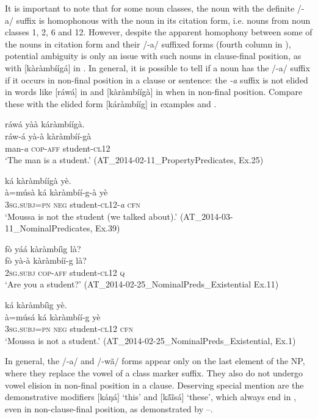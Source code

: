 \documentclass[output=paper]{langsci/langscibook}
\begin{document}
It is important to note that for some noun classes, the noun with the definite /-a/ suffix is homophonous with the noun in its citation form, i.e. nouns from noun classes 1, 2, 6 and 12. However, despite the apparent homophony between some of the nouns in citation form and their /-a/ suffixed forms (fourth column in ), potential ambiguity is only an issue with such nouns in clause-final position, as with [kàràmbíígá] in . In general, it is possible to tell if a noun has the /-a/ suffix if it occurs in non-final position in a clause or sentence: the \textit{-a} suffix is not elided in words like [ráwá] in  and [kàràmbíígà] in  when in non-final position. Compare these with the elided form [káràmbííg] in examples  and .

\ea\label{ex:teo:17}
\glll ráwá yàà káràmbíígà.\\
ráw-á yà-à kàràmbíí-gà\\
man-\textit{a} \textsc{cop-aff} student-\textsc{cl12}\\
\glt ‘The man is a student.’ (AT\_2014-02-11\_PropertyPredicates, Ex.25)
\z


\ea\label{ex:teo:18}
 ká kàràmbíígà yè.\\
à=músà ká kàràmbíí-g-à yè \\
3\textsc{sg.subj=pn} \textsc{neg} student-\textsc{cl}12-\textit{a} \textsc{cfn}\\
\glt ‘Moussa is not the student (we talked about).’ (AT\_2014-03-11\_NominalPredicates, Ex.39)
\z

\ea\label{ex:teo:19}
\glll fò yáá kàràmbíìg là?\\
 fò yà-à kàràmbíí-g là?\\
2\textsc{sg.subj} \textsc{cop-aff} student-\textsc{cl}12 \textsc{q}\\
\glt ‘Are you a student?’ (AT\_2014-02-25\_NominalPreds\_Existential Ex.11)
\z

\ea\label{ex:teo:20}
 ká kàràmbíìg yè.\\
 à=músá ká kàràmbíí-g yè\\
3\textsc{sg.subj=pn} \textsc{neg} student-\textsc{cl}12 \textsc{cfn}\\
\glt ‘Moussa is not a student.’ (AT\_2014-02-25\_NominalPreds\_Existential, Ex.1)
\z

In general, the /-a/ and /-wã/ forms appear only on the last element of the NP, where they replace the vowel of a class marker suffix. They also do not undergo vowel elision in non-final position in a clause. Deserving special mention are the demonstrative modifiers [káŋá] ‘this’ and [k\'{ã}\~{i}sá] ‘these’, which always end in \-[-a], even in non-clause-final position, as demonstrated by –.
\end{document}
